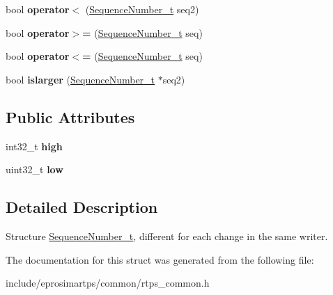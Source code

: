 \begin{DoxyCompactItemize}
\item 
\hypertarget{structeprosima_1_1rtps_1_1_sequence_number__t_aeb1e8cdcd0c2fc646936a7fd69f80f20}{bool {\bfseries operator$<$} (\hyperlink{structeprosima_1_1rtps_1_1_sequence_number__t}{\-Sequence\-Number\-\_\-t} seq2)}\label{structeprosima_1_1rtps_1_1_sequence_number__t_aeb1e8cdcd0c2fc646936a7fd69f80f20}

\item 
\hypertarget{structeprosima_1_1rtps_1_1_sequence_number__t_ab5c61b70a7d20ed4159fa3599b31c983}{bool {\bfseries operator$>$=} (\hyperlink{structeprosima_1_1rtps_1_1_sequence_number__t}{\-Sequence\-Number\-\_\-t} seq)}\label{structeprosima_1_1rtps_1_1_sequence_number__t_ab5c61b70a7d20ed4159fa3599b31c983}

\item 
\hypertarget{structeprosima_1_1rtps_1_1_sequence_number__t_a89ade199f1d3b6baa7476272a61459bd}{bool {\bfseries operator$<$=} (\hyperlink{structeprosima_1_1rtps_1_1_sequence_number__t}{\-Sequence\-Number\-\_\-t} seq)}\label{structeprosima_1_1rtps_1_1_sequence_number__t_a89ade199f1d3b6baa7476272a61459bd}

\item 
\hypertarget{structeprosima_1_1rtps_1_1_sequence_number__t_aa57c1f198fe72e018b0758b6fe21c8c7}{bool {\bfseries islarger} (\hyperlink{structeprosima_1_1rtps_1_1_sequence_number__t}{\-Sequence\-Number\-\_\-t} $\ast$seq2)}\label{structeprosima_1_1rtps_1_1_sequence_number__t_aa57c1f198fe72e018b0758b6fe21c8c7}

\end{DoxyCompactItemize}
\subsection*{\-Public \-Attributes}
\begin{DoxyCompactItemize}
\item 
\hypertarget{structeprosima_1_1rtps_1_1_sequence_number__t_a90101642c333d9a9c28e4f32a58c63bd}{int32\-\_\-t {\bfseries high}}\label{structeprosima_1_1rtps_1_1_sequence_number__t_a90101642c333d9a9c28e4f32a58c63bd}

\item 
\hypertarget{structeprosima_1_1rtps_1_1_sequence_number__t_a51fb3334a63b7fc7aac6eddb02910de3}{uint32\-\_\-t {\bfseries low}}\label{structeprosima_1_1rtps_1_1_sequence_number__t_a51fb3334a63b7fc7aac6eddb02910de3}

\end{DoxyCompactItemize}


\subsection{\-Detailed \-Description}
\-Structure \hyperlink{structeprosima_1_1rtps_1_1_sequence_number__t}{\-Sequence\-Number\-\_\-t}, different for each change in the same writer. 

\-The documentation for this struct was generated from the following file\-:\begin{DoxyCompactItemize}
\item 
include/eprosimartps/common/rtps\-\_\-common.\-h\end{DoxyCompactItemize}
